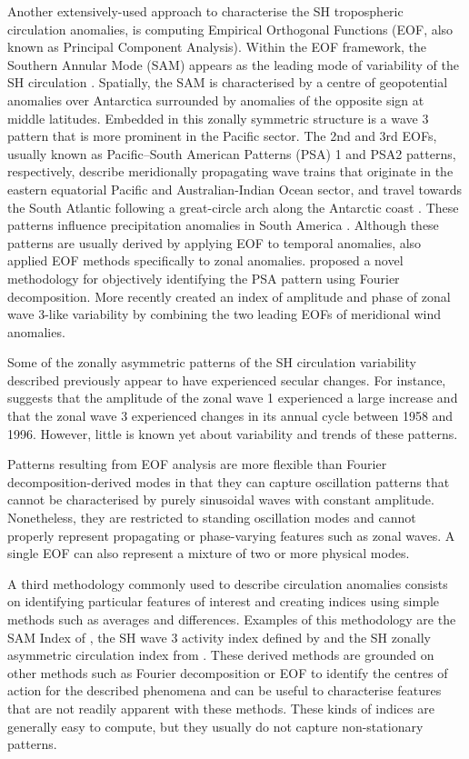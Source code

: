 \documentclass[pdflatex,lineno,sn-basic]{sn-jnl}
\theoremstyle{thmstyleone}%
\theoremstyle{thmstyletwo}%
\theoremstyle{thmstylethree}%
\begin{document}
Another extensively-used approach to characterise the SH tropospheric circulation anomalies, is computing Empirical Orthogonal Functions (EOF, also known as Principal Component Analysis).
Within the EOF framework, the Southern Annular Mode (SAM) appears as the leading mode of variability of the SH circulation \citep{fogt2020}.
Spatially, the SAM is characterised by a centre of geopotential anomalies over Antarctica surrounded by anomalies of the opposite sign at middle latitudes.
Embedded in this zonally symmetric structure is a wave 3 pattern that is more prominent in the Pacific sector.
The 2nd and 3rd EOFs, usually known as Pacific--South American Patterns (PSA) 1 and PSA2 patterns, respectively, describe meridionally propagating wave trains that originate in the eastern equatorial Pacific and Australian-Indian Ocean sector, and travel towards the South Atlantic following a great-circle arch along the Antarctic coast \citep{mo2001}.
These patterns influence precipitation anomalies in South America \citep{mo2001}.
Although these patterns are usually derived by applying EOF to temporal anomalies, \citet{raphael2003} also applied EOF methods specifically to zonal anomalies.
\citet{irving2016} proposed a novel methodology for objectively identifying the PSA pattern using Fourier decomposition.
More recently \citet{goyal2022} created an index of amplitude and phase of zonal wave 3-like variability by combining the two leading EOFs of meridional wind anomalies.

Some of the zonally asymmetric patterns of the SH circulation variability described previously appear to have experienced secular changes.
For instance, \citet{raphael2003} suggests that the amplitude of the zonal wave 1 experienced a large increase and that the zonal wave 3 experienced changes in its annual cycle between 1958 and 1996.
However, little is known yet about variability and trends of these patterns.

Patterns resulting from EOF analysis are more flexible than Fourier decomposition-derived modes in that they can capture oscillation patterns that cannot be characterised by purely sinusoidal waves with constant amplitude.
Nonetheless, they are restricted to standing oscillation modes and cannot properly represent propagating or phase-varying features such as zonal waves.
A single EOF can also represent a mixture of two or more physical modes.

A third methodology commonly used to describe circulation anomalies consists on identifying particular features of interest and creating indices using simple methods such as averages and differences.
Examples of this methodology are the SAM Index of \citet{gong1999}, the SH wave 3 activity index defined by \citet{raphael2004} and the SH zonally asymmetric circulation index from \citet{hobbs2010}.
These derived methods are grounded on other methods such as Fourier decomposition or EOF to identify the centres of action for the described phenomena and can be useful to characterise features that are not readily apparent with these methods.
These kinds of indices are generally easy to compute, but they usually do not capture non-stationary patterns.
\end{document}
